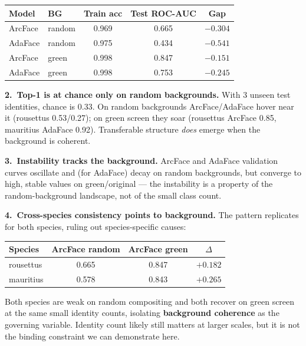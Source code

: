 \documentclass[11pt, a4paper]{article}
\begin{document}
\begin{center}
\setlength{\tabcolsep}{6pt}
\begin{tabular}{llccc}
\toprule
Model & BG & Train acc & Test ROC-AUC & Gap \\
\midrule
ArcFace & random & 0.969 & 0.665 & $-0.304$ \\
AdaFace & random & 0.975 & 0.434 & $-0.541$ \\
ArcFace & green  & 0.998 & 0.847 & $-0.151$ \\
AdaFace & green  & 0.998 & 0.753 & $-0.245$ \\
\bottomrule
\end{tabular}
\end{center}

\smallskip
\textbf{2.\ Top-1 is at chance only on random backgrounds.}
With 3 unseen test identities, chance is 0.33.  On random backgrounds ArcFace/AdaFace
hover near it (rousettus 0.53/0.27); on green screen they soar (rousettus ArcFace 0.85,
mauritius AdaFace 0.92).  Transferable structure \emph{does} emerge when the background
is coherent.

\smallskip
\textbf{3.\ Instability tracks the background.}
ArcFace and AdaFace validation curves oscillate and (for AdaFace) decay on random
backgrounds, but converge to high, stable values on green/original --- the instability is
a property of the random-background landscape, not of the small class count.

\smallskip
\textbf{4.\ Cross-species consistency points to background.}
The pattern replicates for both species, ruling out species-specific causes:

\begin{center}
\setlength{\tabcolsep}{6pt}
\begin{tabular}{lccc}
\toprule
Species & ArcFace random & ArcFace green & $\Delta$ \\
\midrule
rousettus & 0.665 & 0.847 & $+0.182$ \\
mauritius & 0.578 & 0.843 & $+0.265$ \\
\bottomrule
\end{tabular}
\end{center}

Both species are weak on random compositing and both recover on green screen at the same
small identity counts, isolating \textbf{background coherence} as the governing variable.
Identity count likely still matters at larger scales, but it is not the binding constraint
we can demonstrate here.
\end{document}
